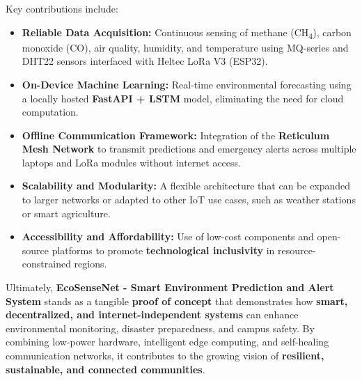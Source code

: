 Key contributions include:
\begin{itemize}
    \item \textbf{Reliable Data Acquisition:} Continuous sensing of methane (CH\textsubscript{4}), carbon monoxide (CO), air quality, humidity, and temperature using MQ-series and DHT22 sensors interfaced with Heltec LoRa V3 (ESP32).
    \item \textbf{On-Device Machine Learning:} Real-time environmental forecasting using a locally hosted \textbf{FastAPI + LSTM} model, eliminating the need for cloud computation.
    \item \textbf{Offline Communication Framework:} Integration of the \textbf{Reticulum Mesh Network} to transmit predictions and emergency alerts across multiple laptops and LoRa modules without internet access.
    \item \textbf{Scalability and Modularity:} A flexible architecture that can be expanded to larger networks or adapted to other IoT use cases, such as weather stations or smart agriculture.
    \item \textbf{Accessibility and Affordability:} Use of low-cost components and open-source platforms to promote \textbf{technological inclusivity} in resource-constrained regions.
\end{itemize}

Ultimately, \textbf{EcoSenseNet - Smart Environment Prediction and Alert System} stands as a tangible \textbf{proof of concept} that demonstrates how \textbf{smart, decentralized, and internet-independent systems} can enhance environmental monitoring, disaster preparedness, and campus safety. By combining low-power hardware, intelligent edge computing, and self-healing communication networks, it contributes to the growing vision of \textbf{resilient, sustainable, and connected communities}.
